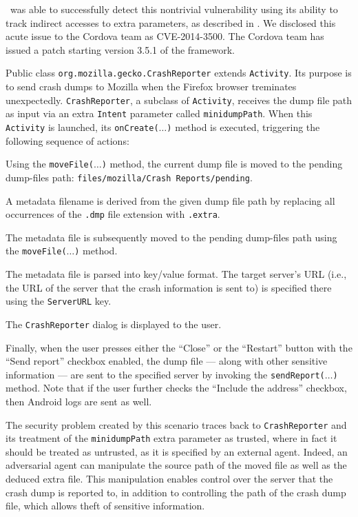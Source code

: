 \Tool\ was able to successfully detect this nontrivial vulnerability using its ability to track indirect accesses to extra parameters, as described in .
We  disclosed this acute issue to the Cordova team as CVE-2014-3500. The Cordova team has issued a patch starting version 3.5.1 of the framework.

\label{Se:FirefoxFileManipulation}
Public class {\tt org.mozilla.gecko.CrashReporter} extends {\tt Activity}. Its purpose is to send crash dumps to Mozilla when the Firefox browser treminates unexpectedly.
{\tt CrashReporter}, a subclass of {\tt Activity}, receives the dump file path as input via an extra {\tt Intent} parameter called {\tt minidumpPath}. When this {\tt Activity} is launched, its {\tt onCreate($\ldots$)} method is executed, triggering the following sequence of actions:
\begin{compactenum}
	\item Using the \texttt{moveFile($\ldots$)} method, the current dump file is moved to the pending dump-files path: \texttt{files/mozilla/Crash Reports/pending}.
	\item A metadata filename is derived from the given dump file path by replacing all occurrences of the {\tt .dmp} file extension with  {\tt .extra}. 
	\item The metadata file is subsequently moved to the pending dump-files path using the \texttt{moveFile($\ldots$)} method.
	\item The metadata file is parsed into key/value format. The target server's URL (i.e., the URL of the server that the crash information is sent to) is specified there using the \texttt{ServerURL} key.
	\item The {\tt CrashReporter} dialog is displayed to the user.
	\item Finally, when the user presses either the ``Close'' or the ``Restart'' button with the ``Send report'' checkbox enabled, the dump file --- along with other sensitive information --- are sent to the specified server by invoking the {\tt sendReport($\ldots$)} method. Note that if the user further checks the ``Include the address'' checkbox, then Android logs are sent as well.
\end{compactenum}

The security problem created by this scenario traces back to {\tt CrashReporter} and its treatment of the {\tt minidumpPath} extra parameter as trusted, where in fact it should be treated as untrusted, as it is specified by an external agent.
%
Indeed, an adversarial agent can manipulate the source path of the moved file as well as the deduced extra file. 
This manipulation enables control over the server that the crash dump is reported to, in addition to controlling the path of the crash dump file, which allows theft of sensitive information.

